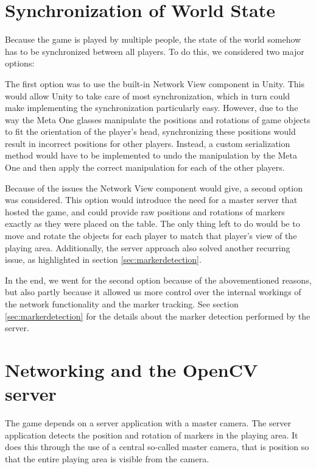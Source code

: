 	\section{Synchronization of World State} \label{sec:synchronization}
		Because the game is played by multiple people, the state of the world
        somehow has to be synchronized between all players. To do this, we 
        considered two major options:
        
        The first option was to use the built-in Network View component in 
        Unity. This would allow Unity to take care of most synchronization,
        which in turn could make implementing the synchronization particularly
        easy. However, due to the way the Meta One glasses manipulate the 
        positions and rotations of game objects to fit the orientation of the 
        player's head, synchronizing these positions would result in incorrect
        positions for other players. Instead, a custom serialization method 
        would have to be implemented to undo the manipulation by the Meta One
        and then apply the correct manipulation for each of the other players.
        
        Because of the issues the Network View component would give, a second
        option was considered. This option would introduce the need for a 
        master server that hosted the game, and could provide raw positions
        and rotations of markers exactly as they were placed on the table.
        The only thing left to do would be to move and rotate the objects for 
        each player to match that player's view of the playing area. 
        Additionally, the server approach also solved another recurring issue,
        as highlighted in section \ref{sec:markerdetection}.
        
        In the end, we went for the second option because of the abovementioned
        reasons, but also partly because it allowed us more control over the 
        internal workings of the network functionality and the marker tracking.
        See section \ref{sec:markerdetection} for the details about the marker
        detection performed by the server.
		
	\section{Networking and the OpenCV server} \label{sec:network}
		The game depends on a server application with a master camera. The 
        server application detects the position and rotation of markers in the 
        playing area. It does this through the use of a central so-called master 
        camera, that is position so that the entire playing area is visible from 
        the camera.
        
